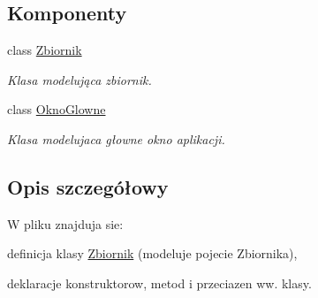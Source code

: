 \subsection*{Komponenty}
\begin{DoxyCompactItemize}
\item 
class \hyperlink{class_zbiornik}{Zbiornik}
\begin{DoxyCompactList}\small\item\em Klasa modelująca zbiornik. \end{DoxyCompactList}\item 
class \hyperlink{class_okno_glowne}{Okno\+Glowne}
\begin{DoxyCompactList}\small\item\em Klasa modelujaca głowne okno aplikacji. \end{DoxyCompactList}\end{DoxyCompactItemize}


\subsection{Opis szczegółowy}
W pliku znajduja sie\+:
\begin{DoxyItemize}
\item definicja klasy \hyperlink{class_zbiornik}{Zbiornik} (modeluje pojecie Zbiornika),
\item deklaracje konstruktorow, metod i przeciazen ww. klasy. 
\end{DoxyItemize}